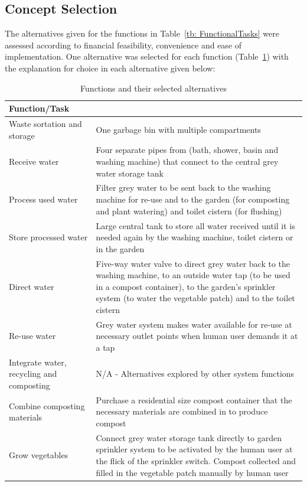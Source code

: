 \documentclass[a4paper,11pt,fleqn]{report}
\begin{document}
\subsection{Concept Selection}
The alternatives given for the functions in Table~\ref{tb: FunctionalTasks} were assessed according to financial feasibility, convenience and ease of implementation. One alternative was selected for each function (Table~\ref{tb: chosen_Alts}) with the explanation for choice in each alternative given below:
%
\begin{table}[h!]
\caption {Functions and their selected alternatives} \label{tb: chosen_Alts} 
\begin{center}
\begin{tabular}{p{3.5cm}|p{9cm}}\toprule
	{\textbf{Function/Task}} & {\textbf{Selected Alternative}\\ \midrule
    Waste sortation and storage & One garbage bin with multiple compartments \\
     \hline
     Receive water & Four separate pipes from (bath, shower, basin and washing machine) that connect to the central grey water storage tank\\
    \hline
    Process used water & Filter grey water to be sent back to the washing machine for re-use and to the garden (for composting and plant watering) and toilet cistern (for flushing)\\
    \hline
    Store processed water & Large central tank to store all water received until it is needed again by the washing machine, toilet cistern or in the garden\\
    \hline
    Direct water & Five-way water valve to direct grey water back to the washing machine, to an outside water tap (to be used in a compost container), to the garden's sprinkler system (to water the vegetable patch) and to the toilet cistern\\
    \hline
    Re-use water & Grey water system makes water available for re-use at necessary outlet points when human user demands it at a tap\\
    \hline
    Integrate water, recycling and composting & N/A - Alternatives explored by other system functions\\
    \hline
     Combine composting materials & Purchase a residential size compost container that the necessary materials are combined in to produce compost\\
    \hline
Grow vegetables & Connect grey water storage tank directly to garden sprinkler system to be activated by the human user at the flick of the sprinkler switch. Compost collected and filled in the vegetable patch manually by human user\\
    \hline
    \bottomrule
\end{tabular}
\end{center}
\end{table}
%
\end{document}
